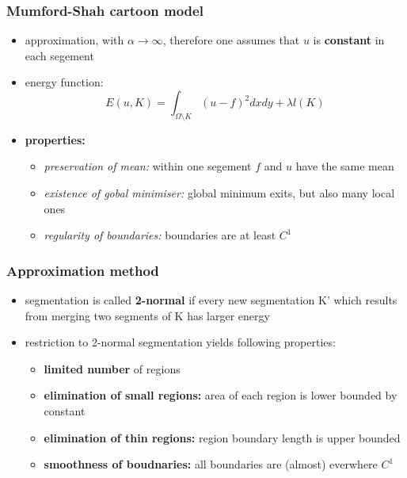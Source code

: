 \documentclass[11pt]{article}
\begin{document}
\subsubsection{Mumford-Shah cartoon model}
\label{sec-8-1-1}
\begin{itemize}
\item approximation, with $\alpha \rightarrow \infty$, therefore one assumes that $u$ is
      \textbf{constant} in each segement
\item energy function:
      \[ E(u,K) = \int_{\Omega\setminus K} (u-f)^2 dxdy +\lambda l(K) \]
\item \textbf{properties:}
\begin{itemize}
\item \emph{preservation of mean:} within one segement $f$ and $u$ have the same mean
\item \emph{existence of gobal minimiser:} global minimum exits, but also many local ones
\item \emph{regularity of boundaries:}  boundaries are at least $C^1$
\end{itemize}
\end{itemize}
\subsubsection{Approximation method}
\label{sec-8-1-2}
\begin{itemize}
\item segmentation is called \textbf{2-normal} if every new segmentation K' which results from
merging two segments of K has larger energy
\item restriction to 2-normal segmentation yields following properties:
\begin{itemize}
\item \textbf{limited number} of regions
\item \textbf{elimination of small regions:} area of each region is lower bounded by constant
\item \textbf{elimination of thin regions:} region boundary length is upper bounded
\item \textbf{smoothness of boudnaries:} all boundaries are (almost) everwhere $C^1$
\end{itemize}
\end{itemize}
\end{document}
